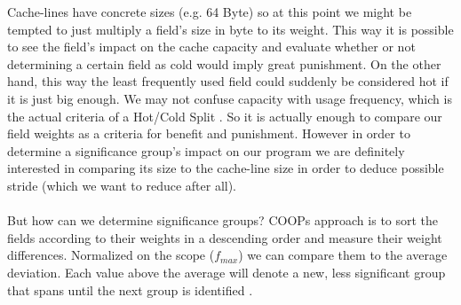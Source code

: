 Cache-lines have concrete sizes (e.g. 64 Byte) so at this point we might be tempted to just multiply a field's size in byte to its weight. This way it is possible to see the field's impact on the cache capacity and evaluate whether or not determining a certain field as cold would imply great punishment. On the other hand, this way the least frequently used field could suddenly be considered hot if it is just big enough. We may not confuse capacity with usage frequency, which is the actual criteria of a Hot/Cold Split . So it is actually enough to compare our field weights as a criteria for benefit and punishment. However in order to determine a significance group's impact on our program we are definitely interested in comparing its size to the cache-line size in order to deduce possible stride (which we want to reduce after all).\\\\
But how can we determine significance groups? COOPs approach is to sort the fields according to their weights in a descending order and measure their weight differences. Normalized on the scope ($f_{max}$) we can compare them to the average deviation. Each value above the average will denote a new, less significant group that spans until the next group is identified .
